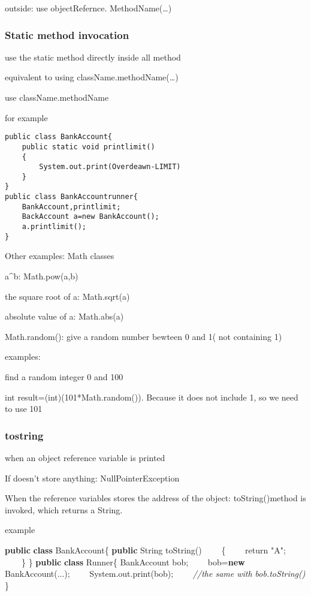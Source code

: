 \documentclass[
  paper=a4,
  ,captions=tableheading
]{scrartcl}
\newenvironment{Shaded}{}{}
\newcommand{\BuiltInTok}[1]{#1}
\newcommand{\CommentTok}[1]{\textcolor[rgb]{0.38,0.63,0.69}{\textit{#1}}}
\newcommand{\FunctionTok}[1]{\textcolor[rgb]{0.02,0.16,0.49}{#1}}
\newcommand{\KeywordTok}[1]{\textcolor[rgb]{0.00,0.44,0.13}{\textbf{#1}}}
\newcommand{\NormalTok}[1]{#1}
\newcommand{\StringTok}[1]{\textcolor[rgb]{0.25,0.44,0.63}{#1}}
\begin{document}
outside: use objectRefernce. MethodName(\ldots{})

\hypertarget{static-method-invocation}{%
\subsubsection{Static method
invocation}\label{static-method-invocation}}

use the static method directly inside all method

equivalent to using className.methodName(\ldots{})

use className.methodName

for example

\begin{verbatim}
public class BankAccount{
    public static void printlimit()
    {
        System.out.print(Overdeawn-LIMIT)
    }
}
public class BankAccountrunner{
    BankAccount,printlimit;
    BackAccount a=new BankAccount();
    a.printlimit();
}
\end{verbatim}

Other examples: Math classes

a\^{}b: Math.pow(a,b)

the square root of a: Math.sqrt(a)

absolute value of a: Math.abs(a)

Math.random(): give a random number bewteen 0 and 1( not containing 1)

examples:

find a random integer 0 and 100

int result=(int)(101*Math.random()). Because it does not include 1, so
we need to use 101

\hypertarget{tostring}{%
\subsubsection{tostring}\label{tostring}}

when an object reference variable is printed

If doesn't store anything: NullPointerException

When the reference variables stores the address of the object:
toString()method is invoked, which returns a String.

example

\begin{Shaded}
\begin{Highlighting}[]
\KeywordTok{public} \KeywordTok{class}\NormalTok{ BankAccount\{}
    \KeywordTok{public} \BuiltInTok{String} \FunctionTok{toString}\NormalTok{()}
\NormalTok{    \{}
\NormalTok{        return }\StringTok{"A"}\NormalTok{;}
\NormalTok{    \}}
\NormalTok{\}}
\KeywordTok{public} \KeywordTok{class}\NormalTok{ Runner\{}
\NormalTok{    BankAccount bob;}
\NormalTok{    bob=}\KeywordTok{new} \FunctionTok{BankAccount}\NormalTok{(...);}
\NormalTok{    System.}\FunctionTok{out}\NormalTok{.}\FunctionTok{print}\NormalTok{(bob);}
    \CommentTok{//the same with bob.toString()}
\NormalTok{\}}
\end{Highlighting}
\end{Shaded}
\end{document}

